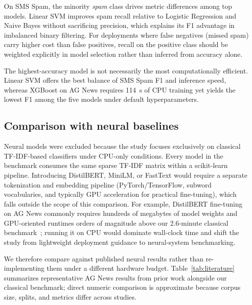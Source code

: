\documentclass[pdflatex,sn-mathphys-num]{sn-jnl}
\begin{document}
On SMS Spam, the minority \textit{spam} class drives metric differences among top models. Linear SVM improves spam recall relative to Logistic Regression and Naive Bayes without sacrificing precision, which explains its F1 advantage in imbalanced binary filtering. For deployments where false negatives (missed spam) carry higher cost than false positives, recall on the positive class should be weighted explicitly in model selection rather than inferred from accuracy alone.

The highest-accuracy model is not necessarily the most computationally efficient. Linear SVM offers the best balance of SMS Spam F1 and inference speed, whereas XGBoost on AG News requires 114~s of CPU training yet yields the lowest F1 among the five models under default hyperparameters.

\subsection{Comparison with neural baselines}\label{sec:neural}

Neural models were excluded because the study focuses exclusively on classical TF-IDF-based classifiers under CPU-only conditions. Every model in the benchmark consumes the same sparse TF-IDF matrix within a scikit-learn pipeline. Introducing DistilBERT, MiniLM, or FastText would require a separate tokenization and embedding pipeline (PyTorch/TensorFlow, subword vocabularies, and typically GPU acceleration for practical fine-tuning), which falls outside the scope of this comparison. For example, DistilBERT fine-tuning on AG News commonly requires hundreds of megabytes of model weights and GPU-oriented runtimes orders of magnitude above our 2.6-minute classical benchmark~\cite{sanh2020distilbert,wang2024atcbench}; running it on CPU would dominate wall-clock time and shift the study from lightweight deployment guidance to neural-system benchmarking.

We therefore compare against published neural results rather than re-implementing them under a different hardware budget. Table~\ref{tab:literature} summarizes representative AG News results from prior work alongside our classical benchmark; direct numeric comparison is approximate because corpus size, splits, and metrics differ across studies.
\end{document}

